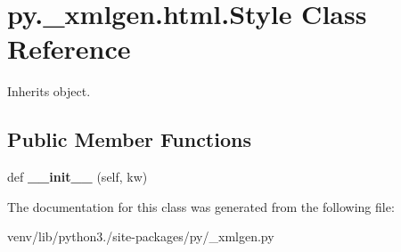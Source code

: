 \hypertarget{classpy_1_1__xmlgen_1_1html_1_1_style}{}\section{py.\+\_\+xmlgen.\+html.\+Style Class Reference}
\label{classpy_1_1__xmlgen_1_1html_1_1_style}


Inherits object.

\subsection*{Public Member Functions}
\begin{DoxyCompactItemize}
\item 
\mbox{\label{classpy_1_1__xmlgen_1_1html_1_1_style_a87c235955b5de89ad0d38eb5c80a6f5a}} 
def {\bfseries \+\_\+\+\_\+init\+\_\+\+\_\+} (self, kw)
\end{DoxyCompactItemize}


The documentation for this class was generated from the following file\+:\begin{DoxyCompactItemize}
\item 
venv/lib/python3./site-\/packages/py/\+\_\+xmlgen.\+py\end{DoxyCompactItemize}
